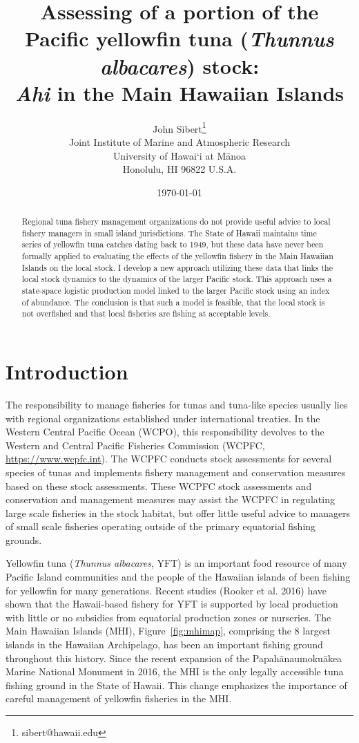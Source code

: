 \documentclass[12pt,letterpaper]{article}
\title{Assessing of a portion of the Pacific yellowfin tuna 
({\it Thunnus albacares}) stock:\\[0.125in]
{\it Ahi} in the Main Hawaiian Islands}
\author{
John Sibert\thanks{sibert@hawaii.edu}\\
Joint Institute of Marine and Atmospheric Research\\
University of Hawai`i at M\={a}noa\\
Honolulu, HI  96822 U.S.A.\\[0.125in]
\date{\today}
}
\newcommand\doublespacing{\baselineskip=1.6\normalbaselineskip}
\newcommand\help[1]{\color{Magenta}{\it #1}\normalcolor}
\begin{document}
\maketitle


\begin{abstract}
Regional tuna fishery management organizations do not provide useful
advice to local fishery managers in small island jurisdictions. The
State of Hawaii maintains time series of yellowfin tuna catches dating
back to 1949, but these data have never been formally applied to
evaluating the effects of the yellowfin fishery in the Main Hawaiian
Islands on the local stock. I develop a new approach utilizing these
data that links the local stock dynamics to the dynamics of the larger
Pacific stock. This approach uses a state-space logistic production
model linked to the larger Pacific stock using an index of abundance. The
conclusion is that such a model is feasible, that the local stock
is not overfished and that local fisheries are fishing at acceptable
levels. \help{and data and indices}
\end{abstract}


\section*{Introduction}
The responsibility to manage fisheries for tunas and tuna-like
species usually
lies with regional organizations established under international treaties.
In the Western Central Pacific Ocean (WCPO), this responsibility devolves to
the Western and Central Pacific Fisheries Commission (WCPFC, 
\url{https://www.wcpfc.int}).
The WCPFC conducts stock assessments for several species of tunas and
implements fishery management and conservation measures based on
these stock assessments. 
These WCPFC stock assessments and conservation and management measures
may assist the WCPFC in regulating large scale fisheries in the stock
habitat, but offer little useful advice to managers of small scale
fisheries operating outside of the primary equatorial fishing grounds.

Yellowfin tuna ({\it Thunnus albacares}, YFT) is an important food resource
of many Pacific Island communities and the people of the Hawaiian
islands of been fishing for yellowfin for many generations. 
Recent studies (Rooker et al. 2016) have shown that the Hawaii-based
fishery for YFT is  supported by
local production with little or no subsidies from equatorial
production zones or nurseries.
The Main Hawaiian Islands (MHI), Figure~\ref{fig:mhimap},
comprising the 8 largest islands in the Hawaiian Archipelago,
has been an important fishing ground throughout this history.
Since the recent expansion of the Papah\={a}naumoku\={a}kea Marine National
Monument in 2016, the MHI is the only legally accessible tuna fishing ground
in the State of Hawaii.
This change emphasizes the importance of careful management of yellowfin
fisheries in the MHI.
\end{document}
